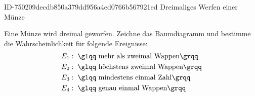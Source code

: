 \begin{exercise}
      {ID-750209decdb850a379dd956a4ed0766b567921ed}
      {Dreimaliges Werfen einer Münze}
  \ifproblem\problem\par
    Eine Münze wird dreimal geworfen. Zeichne das Baumdiagramm und bestimme
    die Wahrscheinlichkeit für folgende Ereignisse:
    \begin{equation*}
      \begin{split}
        E_1&:\;\text{\glqq mehr als zweimal Wappen\grqq} \\
        E_2&:\;\text{\glqq höchstens zweimal Wappen\grqq} \\
        E_3&:\;\text{\glqq mindestens einmal Zahl\grqq} \\
        E_4&:\;\text{\glqq genau einmal Wappen\grqq}
      \end{split}
    \end{equation*}
  \fi
  \ifoutcome\outcome\par
    \begin{center}
\end{center}
\end{exercise}
